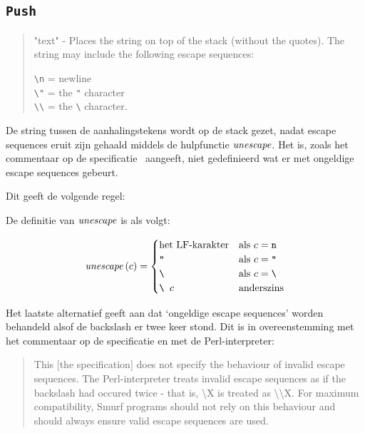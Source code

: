 \subsection{\texttt{Push}}
\label{sec:rules:push}

\begin{quote}
	"text" - Places the string on top of the stack (without the quotes). The
	string may include the following escape sequences:
	
	\verb$\n$ = newline \\
	\verb$\"$ = the \verb$"$ character \\
	\verb$\\$ = the \verb$\$ character.
\end{quote}

De string tussen de aanhalingstekens wordt op de stack gezet, nadat escape
sequences eruit zijn gehaald middels de hulpfunctie $\mathit{unescape}$. Het is,
zoals het commentaar op de specificatie~\cite{safalra} aangeeft, niet
gedefinieerd wat er met ongeldige escape sequences gebeurt.

Dit geeft de volgende regel:
\therpushns%

De definitie van $\mathit{unescape}$ is als volgt:

$$
	\mathit{unescape}\left(c\right) =
		\begin{cases}
			\text{het LF-karakter}      & \text{als $c=\texttt{n}$} \\
			\texttt{"}                  & \text{als $c=\texttt{"}$} \\
			\texttt{\textbackslash}     & \text{als $c=\texttt{\textbackslash}$} \\
			\texttt{\textbackslash~$c$} & \text{anderszins}
		\end{cases}
$$

Het laatste alternatief geeft aan dat `ongeldige escape sequences' worden
behandeld alsof de backslash er twee keer stond. Dit is in overeenstemming met
het commentaar op de specificatie en met de Perl-interpreter: %
\begin{quote}
	This [the specification] does not specify the behaviour of invalid escape
	sequences. The Perl-interpreter treats invalid escape sequences as if the
	backslash had occured twice - that is, \textbackslash X is treated as
	\textbackslash\textbackslash X. For maximum compatibility, Smurf programs
	should not rely on this behaviour and should always ensure valid escape
	sequences are used.
\end{quote}
